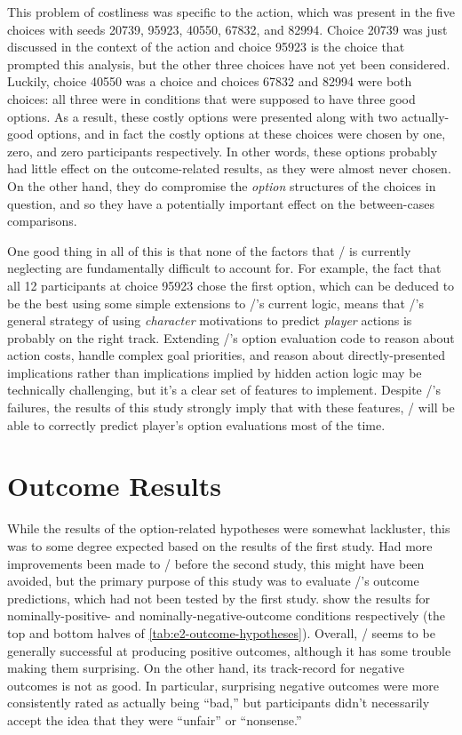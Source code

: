 This problem of costliness was specific to the  action, which was present in the five choices with seeds 20739, 95923, 40550, 67832, and 82994.
%
Choice 20739 was just discussed in the context of the  action and choice 95923 is the choice that prompted this analysis, but the other three choices have not yet been considered.
%
Luckily, choice 40550 was a \unxf{} choice and choices 67832 and 82994 were both \exps{} choices: all three were in conditions that were supposed to have three good options.
%
As a result, these costly options were presented along with two actually-good options, and in fact the costly options at these choices were chosen by one, zero, and zero participants respectively.
%
In other words, these options probably had little effect on the outcome-related results, as they were almost never chosen.
%
On the other hand, they do compromise the \emph{option} structures of the choices in question, and so they have a potentially important effect on the between-cases comparisons.


One good thing in all of this is that none of the factors that \dunyazad/ is currently neglecting are fundamentally difficult to account for.
%
For example, the fact that all 12 participants at choice 95923 chose the first option, which can be deduced to be the best using some simple extensions to \dunyazad/'s current logic, means that \dunyazad/'s general strategy of using \emph{character} motivations to predict \emph{player} actions is probably on the right track.
%
Extending \dunyazad/'s option evaluation code to reason about action costs, handle complex goal priorities, and reason about directly-presented implications rather than implications implied by hidden action logic may be technically challenging, but it's a clear set of features to implement.
%
Despite \dunyazad/'s failures, the results of this study strongly imply that with these features, \dunyazad/ will be able to correctly predict player's option evaluations most of the time.


\section{Outcome Results}

While the results of the option-related hypotheses were somewhat lackluster, this was to some degree expected based on the results of the first study.
%
Had more improvements been made to \dunyazad/ before the second study, this might have been avoided, but the primary purpose of this study was to evaluate \dunyazad/'s outcome predictions, which had not been tested by the first study.
%
 show the results for nominally-positive- and nominally-negative-outcome conditions respectively (the top and bottom halves of \cref{tab:e2-outcome-hypotheses}).
%
Overall, \dunyazad/ seems to be generally successful at producing positive outcomes, although it has some trouble making them surprising.
%
On the other hand, its track-record for negative outcomes is not as good.
%
In particular, surprising negative outcomes were more consistently rated as actually being ``bad,'' but participants didn't necessarily accept the idea that they were ``unfair'' or ``nonsense.''

